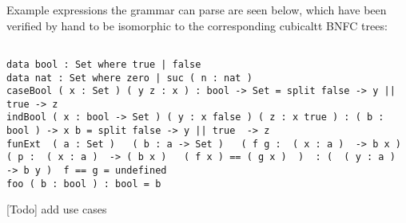 Example expressions the grammar can parse are seen below, which have been
verified by hand to be isomorphic to the corresponding cubicaltt BNFC trees:

\begin{verbatim}

data bool : Set where true | false 
data nat : Set where zero | suc ( n : nat )  
caseBool ( x : Set ) ( y z : x ) : bool -> Set = split false -> y || true -> z
indBool ( x : bool -> Set ) ( y : x false ) ( z : x true ) : ( b : bool ) -> x b = split false -> y || true  -> z
funExt  ( a : Set )   ( b : a -> Set )   ( f g :  ( x : a )  -> b x )   ( p :  ( x : a )  -> ( b x )   ( f x ) == ( g x )  )  : (  ( y : a )  -> b y )  f == g = undefined
foo ( b : bool ) : bool = b

\end{verbatim}

[Todo] add use cases

